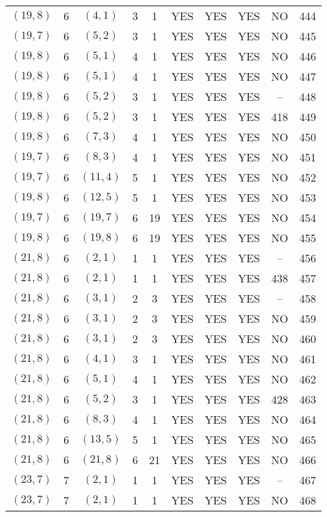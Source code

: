 \begin{longtable}{|c|c|c|c|c|c|c|c|c|c|}
$(19, 8)$ & 6 & $(4, 1)$ & 3 & 1 & YES & YES & YES & NO & 444\\
$(19, 7)$ & 6 & $(5, 2)$ & 3 & 1 & YES & YES & YES & NO & 445\\
$(19, 8)$ & 6 & $(5, 1)$ & 4 & 1 & YES & YES & YES & NO & 446\\
$(19, 8)$ & 6 & $(5, 1)$ & 4 & 1 & YES & YES & YES & NO & 447\\
$(19, 8)$ & 6 & $(5, 2)$ & 3 & 1 & YES & YES & YES & -- & 448\\
$(19, 8)$ & 6 & $(5, 2)$ & 3 & 1 & YES & YES & YES & 418 & 449\\
$(19, 8)$ & 6 & $(7, 3)$ & 4 & 1 & YES & YES & YES & NO & 450\\
$(19, 7)$ & 6 & $(8, 3)$ & 4 & 1 & YES & YES & YES & NO & 451\\
$(19, 7)$ & 6 & $(11, 4)$ & 5 & 1 & YES & YES & YES & NO & 452\\
$(19, 8)$ & 6 & $(12, 5)$ & 5 & 1 & YES & YES & YES & NO & 453\\
$(19, 7)$ & 6 & $(19, 7)$ & 6 & 19 & YES & YES & YES & NO & 454\\
$(19, 8)$ & 6 & $(19, 8)$ & 6 & 19 & YES & YES & YES & NO & 455\\
$(21, 8)$ & 6 & $(2, 1)$ & 1 & 1 & YES & YES & YES & -- & 456\\
$(21, 8)$ & 6 & $(2, 1)$ & 1 & 1 & YES & YES & YES & 438 & 457\\
$(21, 8)$ & 6 & $(3, 1)$ & 2 & 3 & YES & YES & YES & -- & 458\\
$(21, 8)$ & 6 & $(3, 1)$ & 2 & 3 & YES & YES & YES & NO & 459\\
$(21, 8)$ & 6 & $(3, 1)$ & 2 & 3 & YES & YES & YES & NO & 460\\
$(21, 8)$ & 6 & $(4, 1)$ & 3 & 1 & YES & YES & YES & NO & 461\\
$(21, 8)$ & 6 & $(5, 1)$ & 4 & 1 & YES & YES & YES & NO & 462\\
$(21, 8)$ & 6 & $(5, 2)$ & 3 & 1 & YES & YES & YES & 428 & 463\\
$(21, 8)$ & 6 & $(8, 3)$ & 4 & 1 & YES & YES & YES & NO & 464\\
$(21, 8)$ & 6 & $(13, 5)$ & 5 & 1 & YES & YES & YES & NO & 465\\
$(21, 8)$ & 6 & $(21, 8)$ & 6 & 21 & YES & YES & YES & NO & 466\\
$(23, 7)$ & 7 & $(2, 1)$ & 1 & 1 & YES & YES & YES & -- & 467\\
$(23, 7)$ & 7 & $(2, 1)$ & 1 & 1 & YES & YES & YES & NO & 468\\

\end{longtable}
